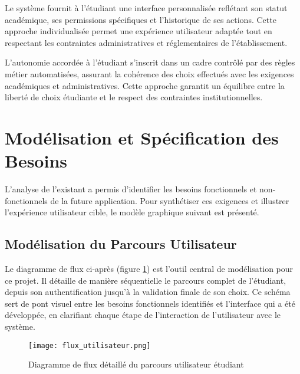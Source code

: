 \documentclass[12pt,a4paper]{report}
\begin{document}
Le système fournit à l'étudiant une interface personnalisée reflétant son statut académique, ses permissions spécifiques et l'historique de ses actions. Cette approche individualisée permet une expérience utilisateur adaptée tout en respectant les contraintes administratives et réglementaires de l'établissement.

L'autonomie accordée à l'étudiant s'inscrit dans un cadre contrôlé par des règles métier automatisées, assurant la cohérence des choix effectués avec les exigences académiques et administratives. Cette approche garantit un équilibre entre la liberté de choix étudiante et le respect des contraintes institutionnelles.




\section{Modélisation et Spécification des Besoins}

L'analyse de l'existant a permis d'identifier les besoins fonctionnels et non-fonctionnels de la future application. Pour synthétiser ces exigences et illustrer l'expérience utilisateur cible, le modèle graphique suivant est présenté.

\subsection{Modélisation du Parcours Utilisateur}

Le diagramme de flux ci-après (figure \ref{fig:flux_utilisateur}) est l'outil central de modélisation pour ce projet. Il détaille de manière séquentielle le parcours complet de l'étudiant, depuis son authentification jusqu'à la validation finale de son choix. Ce schéma sert de pont visuel entre les besoins fonctionnels identifiés et l'interface qui a été développée, en clarifiant chaque étape de l'interaction de l'utilisateur avec le système.

\begin{figure}[h!]
    \centering
    \texttt{[image: flux\_utilisateur.png]}
    \caption{Diagramme de flux détaillé du parcours utilisateur étudiant}
    \label{fig:flux_utilisateur}
\end{figure}
\end{document}
